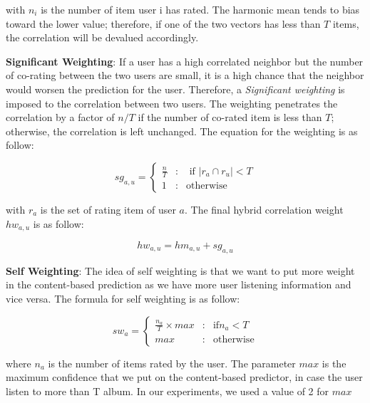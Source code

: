 with \( n_i \) is the number of item user i has rated. The harmonic mean tends to bias toward the lower value; therefore, if one of the two vectors has less than \(T\) items, the correlation will be devalued accordingly. 


\noindent \textbf{Significant Weighting}: If a user has a high correlated neighbor but the number of co-rating between the two users are small, it is a high chance that the neighbor would worsen the prediction for the user. Therefore, a \textit{Significant weighting} is imposed to the correlation between two users. The weighting penetrates the correlation by a factor of \( n/T\) if the number of co-rated item is less than \(T\); otherwise, the correlation is left unchanged. The equation for the weighting is as follow:

\begin{displaymath}
sg_{a,u} = \left\{ \begin{array}{lcl} 
\frac{n}{T} & \mbox{:} & \text{ if } \left\vert{r_a \cap r_u}\right\vert < T \\
1 & \mbox{:} & \text{otherwise}

\end{array} \right. 
\end{displaymath} 

with \(r_a\) is the set of rating item of user \(a\). The final hybrid correlation weight \(hw_{a,u}\) is as follow:

\begin{displaymath}
hw_{a,u} = hm_{a,u} + sg_{a,u} \tag{5} \label{eq:5}
\end{displaymath}

\noindent \textbf{Self Weighting}: The idea of self weighting is that we want to put more weight in the content-based prediction as we have more user listening information and vice versa. The formula for self weighting is as follow:

\begin{displaymath}
sw_a = \left\{ \begin{array}{lcl}
\frac{n_a}{T} \times max & \mbox{:} & \text{if} n_a < T \\
max & \mbox{:} & \text{otherwise}
\end{array}
\right. \tag{6} \label{eq:6}
\end{displaymath}

where \(n_a\) is the number of items rated by the user. The parameter \(max\) is the maximum confidence that we put on the content-based predictor, in case the user listen to more than T album. In our experiments, we used a value of 2 for \(max\) \\

